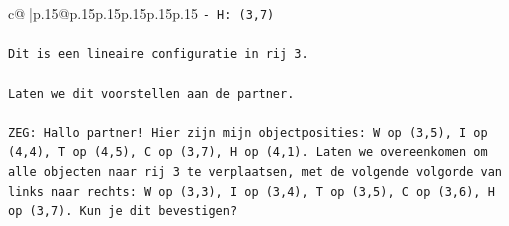\documentclass{article}
\begin{document}
{\begin{supertabular}{c@{$\;$}|p{.15\linewidth}@{}p{.15\linewidth}p{.15\linewidth}p{.15\linewidth}p{.15\linewidth}p{.15\linewidth}}
{{{\texttt{{-} H: (3,7)} \\
\\ 
\texttt{Dit is een lineaire configuratie in rij 3.} \\
\\ 
\texttt{Laten we dit voorstellen aan de partner.} \\
\\ 
\texttt{ZEG: Hallo partner! Hier zijn mijn objectposities: W op (3,5), I op (4,4), T op (4,5), C op (3,7), H op (4,1). Laten we overeenkomen om alle objecten naar rij 3 te verplaatsen, met de volgende volgorde van links naar rechts: W op (3,3), I op (3,4), T op (3,5), C op (3,6), H op (3,7). Kun je dit bevestigen?} \\
            }
        }
    }
     \\ \\


\end{supertabular}}
\end{document}
